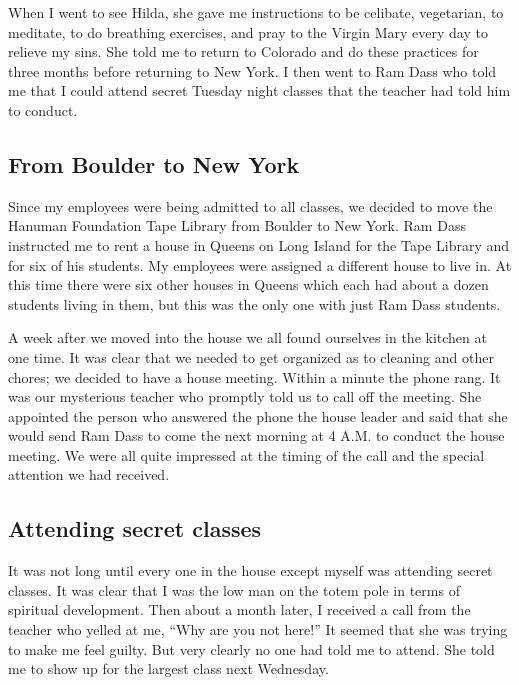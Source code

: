 \documentclass[a5paper,10pt,english]{book}
\begin{document}
\sphinxAtStartPar
When I went to see Hilda, she gave me instructions to be celibate,
vegetarian, to meditate, to do breathing exercises, and pray to the
Virgin Mary every day to relieve my sins. She told me to return to
Colorado and do these practices for three months before returning to New
York. I then went to Ram Dass who told me that I could attend secret
Tuesday night classes that the teacher had told him to conduct.


\subsection{From Boulder to New York}
\label{\detokenize{psychopaths:from-boulder-to-new-york}}
\sphinxAtStartPar
Since my employees were being admitted to all classes, we decided to
move the Hanuman Foundation Tape Library from Boulder to New York. Ram
Dass instructed me to rent a house in Queens on Long Island for the Tape
Library and for six of his students. My employees were assigned a
different house to live in. At this time there were six other houses in
Queens which each had about a dozen students living in them, but this
was the only one with just Ram Dass students.

\sphinxAtStartPar
A week after we moved into the house we all found ourselves in the
kitchen at one time. It was clear that we needed to get organized as to
cleaning and other chores; we decided to have a house meeting. Within a
minute the phone rang. It was our mysterious teacher who promptly told
us to call off the meeting. She appointed the person who answered the
phone the house leader and said that she would send Ram Dass to come the
next morning at 4 A.M. to conduct the house meeting. We were all quite
impressed at the timing of the call and the special attention we had
received.


\subsection{Attending secret classes}
\label{\detokenize{psychopaths:attending-secret-classes}}
\sphinxAtStartPar
It was not long until every one in the house except myself was attending
secret classes. It was clear that I was the low man on the totem pole in
terms of spiritual development. Then about a month later, I received a
call from the teacher who yelled at me, “Why are you not here!” It
seemed that she was trying to make me feel guilty. But very clearly no
one had told me to attend. She told me to show up for the largest class
next Wednesday.
\end{document}
